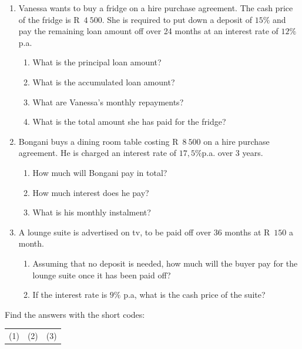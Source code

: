 \begin{exercises}{}{
    \begin{enumerate}[label=\textbf{\arabic*}.]
	\item Vanessa wants to buy a fridge on a hire purchase agreement. The cash price of the fridge is R~$4~500$. She is required to put down a deposit of $15\%$ and pay the remaining loan amount off over 24 months at an interest rate of $12\%$ p.a.
	\begin{enumerate}[noitemsep, label=\textbf{(\alph*)} ]
	    \item What is the principal loan amount?
	    \item What is the accumulated loan amount?
	    \item What are Vanessa’s monthly repayments?
	    \item What is the total amount she has paid for the fridge?
	\end{enumerate}


	\item Bongani buys a dining room table costing R~$8~500$ on a hire purchase agreement. He is charged an interest rate of $17,5\%$p.a. over 3 years.
	\begin{enumerate}[noitemsep, label=\textbf{(\alph*)} ]
	    \item How much will Bongani pay in total?
	    \item How much interest does he pay?
	    \item What is his monthly instalment?
	\end{enumerate}

	\item A lounge suite is advertised on tv, to be paid off over 36 months at R~$150$ a month.
	\begin{enumerate}[noitemsep, label=\textbf{(\alph*)} ]
	    \item Assuming that no deposit is needed, how much will the buyer pay for the lounge suite once it has been paid off?
	    \item If the interest rate is $9\%$ p.a, what is the cash price of the suite?\\
	\end{enumerate}
    \end{enumerate}

    Find the answers with the short codes:\\
    \begin{tabularx}{\textwidth}{ XXX }
	(1)	&	(2)	&	(3)\\
    \end{tabularx}
}
\end{exercises}



